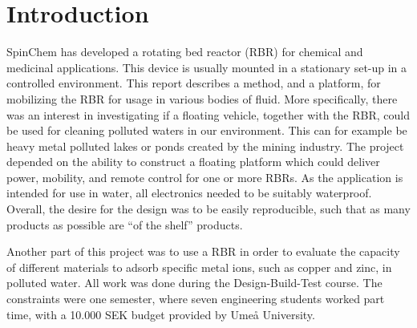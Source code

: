\section{Introduction}

SpinChem\textsuperscript{\textregistered} has developed a rotating bed reactor (RBR) for chemical and medicinal
applications. This device is usually mounted in a stationary set-up in a
controlled environment. This report describes a method, and a platform, for
mobilizing the RBR for usage in various bodies of fluid. More specifically,
there was an interest in investigating if a floating vehicle, together with the RBR,
could be used for cleaning polluted waters in our environment. This can for example be heavy metal
polluted lakes or ponds created by the mining industry. The project depended on
the ability to construct a floating platform which could deliver power,
mobility, and remote control for one or more RBRs. As the application is intended for
use in water, all electronics needed to be suitably waterproof. Overall, the
desire for the design was to be easily reproducible, such that as many products as
possible are ``of the shelf'' products.

Another part of this project was to use a RBR in order to evaluate the capacity of
different materials to adsorb specific metal ions, such as copper and zinc, in
polluted water. All work was done during the Design-Build-Test course. The constraints were one semester, where seven engineering students worked
part time, with a 10.000 SEK budget provided by Umeå University.
